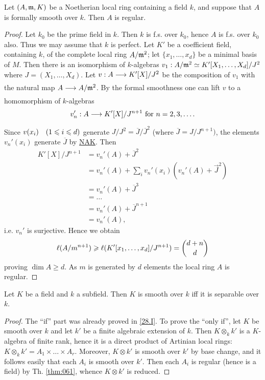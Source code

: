 \documentclass[../main]{subfiles}
\begin{document}
\begin{partheorem}\label{thm:061}
Let $(A, \mathfrak{m}, K)$ be a Noetherian local ring containing a field $k$, and suppose that $A$ is formally smooth over $k$. Then $A$ is regular.
\end{partheorem}
\begin{proof}
 Let $k_0$ be the prime field in $k$. Then $k$ is f.s. over $k_0$, hence $A$ is f.s. over $k_0$ also. Thus we may assume that $k$ is perfect. Let $K'$ be a coefficient field, containing $k$, of the complete local ring $A/\mathfrak{m}^2$; let $\{x_1, \ldots, x_d\}$ be a minimal basis of $M$. Then there is an isomorphism of $k$-algebras $v_1: A/\mathfrak{m}^2 \simeq K'[X_1, \dots, X_d] / J^2$ where $J=(X_1, \ldots, X_d)$. Let $v: A \varrightarrow{} K'[X] / J^2$ be the composition of $v_1$ with the natural map $A \varrightarrow{} A/\ideal{m}^2$. By the formal smoothness one can lift $v$ to a homomorphism of $k$-algebras \[v'_n: A \varrightarrow{} K'[X] / J^{n+1}\text{ for }n= 2,3, \ldots .\] Since $v(x_i)\for{1 \leqslant i \leqslant d}$ generate $J / J^2=\overline{J} / \overline{J}^2$ (where $\overline{J}=J / J^{n+1})$, the elements $v_n'(x_i)$ generate $\overline{J}$ by \hyperref[NAK]{NAK}. Then \[
 \begin{aligned}
 K'[X] / J^{n+1}&=v_n'(A)+\overline{J}^2\\&=v_n'(A)+\sum_i v_n'(x_i)(v_n'(A)+\vec{J}^2)\\&=v_n'(A)+\overline{J}^3\\&=\ldots\\&=v_n'(A)+\overline{J}^{n+1}\\&=v_n'(A),\end{aligned}\] i.e. $v_n'$ is surjective. Hence we obtain \[\ell(A / m^{n+1}) \geqslant \ell(K'[x_1, \dots, x_d] / J^{n+1})= \binom{d+n}{d}\]proving $\dim A \geqslant d$. As $m$ is generated by $d$ elements the local ring $A$ is regular.
\end{proof}

\begin{partheorem}\label{thm:062}
Let $K$ be a field and $k$ a subfield. Then $K$ is smooth over $k$ iff it is separable over $k$.
\end{partheorem}

\begin{proof} 
 The ``if'' part was already proved in \ref{28.I}. To prove the ``only if'', let $K$ be smooth over $k$ and let $k'$ be a finite algebraic extension of $k$. Then $K \otimes_k k'$ is a $K$-algebra of finite rank, hence it is a direct product of Artinian local rings: $K \otimes_k k'=A_1 \times \ldots \times A_r$. Moreover, $K \otimes k'$ is smooth over $k'$ by base change, and it follows easily that each $A_i$ is smooth over $k'$. Then each $A_i$ is regular (hence is a field) by Th. \ref{thm:061}, whence $K \otimes k'$ is reduced.
\end{proof}
\end{document}
